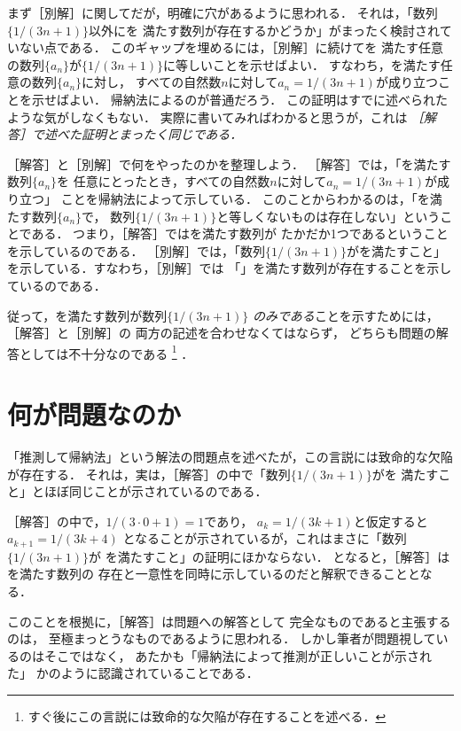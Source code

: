 \documentclass[11pt,a4paper]{ltjsarticle} %
\theoremstyle{mystyle} %
\begin{document}
 
まず［別解］に関してだが，明確に穴があるように思われる．
それは，「数列$\{ 1/(3n+1) \}$以外にを
満たす数列が存在するかどうか」がまったく検討されていない点である．
このギャップを埋めるには，［別解］に続けてを
満たす任意の数列$\{ a_n \}$が$\{ 1/(3n+1) \}$に等しいことを示せばよい．
すなわち，を満たす任意の数列$\{a_n \}$に対し，
すべての自然数$n$に対して$a_n = 1/(3n+1)$が成り立つことを示せばよい．
帰納法によるのが普通だろう．
この証明はすでに述べられたような気がしなくもない．
実際に書いてみればわかると思うが，これは
\emph{［解答］で述べた証明とまったく同じである．}

［解答］と［別解］で何をやったのかを整理しよう．
［解答］では，「を満たす数列$\{ a_n \}$を
任意にとったとき，すべての自然数$n$に対して$a_n = 1/(3n+1)$が成り立つ」
ことを帰納法によって示している．
このことからわかるのは，「を満たす数列$\{ a_n \}$で，
数列$\{ 1/(3n+1) \}$と等しくないものは存在しない」ということである．
つまり，［解答］ではを満たす数列が
たかだか1つであるということを示しているのである．
［別解］では，「数列$\{ 1/(3n+1) \}$がを満たすこと」
を示している．すなわち，［別解］では
「」を満たす数列が存在することを示しているのである．

従って，を満たす数列が数列$\{ 1/(3n+1) \}$
\emph{のみである}ことを示すためには，［解答］と［別解］の
両方の記述を合わせなくてはならず，
どちらも問題の解答としては不十分なのである
\footnote{
  すぐ後にこの言説には致命的な欠陥が存在することを述べる．
}
．


\section{何が問題なのか}
「推測して帰納法」という解法の問題点を述べたが，この言説には致命的な欠陥が存在する．
それは，実は，［解答］の中で「数列$\{ 1/(3n+1) \}$がを
満たすこと」とほぼ同じことが示されているのである．

［解答］の中で，$1/(3 \cdot 0 + 1) =1$であり，
$a_k = 1/(3k+1)$と仮定すると$a_{k+1} = 1/(3k+4)$
となることが示されているが，これはまさに「数列$\{ 1/(3n+1) \}$が
を満たすこと」の証明にほかならない．
となると，［解答］はを満たす数列の
存在と一意性を同時に示しているのだと解釈できることとなる．

このことを根拠に，［解答］は問題への解答として
完全なものであると主張するのは，
至極まっとうなものであるように思われる．
しかし筆者が問題視しているのはそこではなく，
あたかも「帰納法によって推測が正しいことが示された」
かのように認識されていることである．
\end{document}
